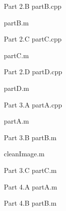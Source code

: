 \documentclass{article}
\begin{document}
	Part 2.B
	partB.cpp
	
	\newpage
	
	
	partB.m
	
	\newpage
	
	Part 2.C
	partC.cpp
	
	\newpage
	
	partC.m
	
	\newpage
	
	Part 2.D
	partD.cpp
	
	\newpage
	
	partD.m
	
	\newpage
	
	Part 3.A
	partA.cpp
	
	\newpage
	
	partA.m
	
	\newpage
	
	Part 3.B
	partB.m
	
	
	\newpage
	cleanImage.m
	
	\newpage
	
	Part 3.C
	partC.m
	
	\newpage
	
	Part 4.A
	partA.m
	
	\newpage
	
	Part 4.B
	partB.m
	
	\newpage
	
	
	
	
\end{document}
